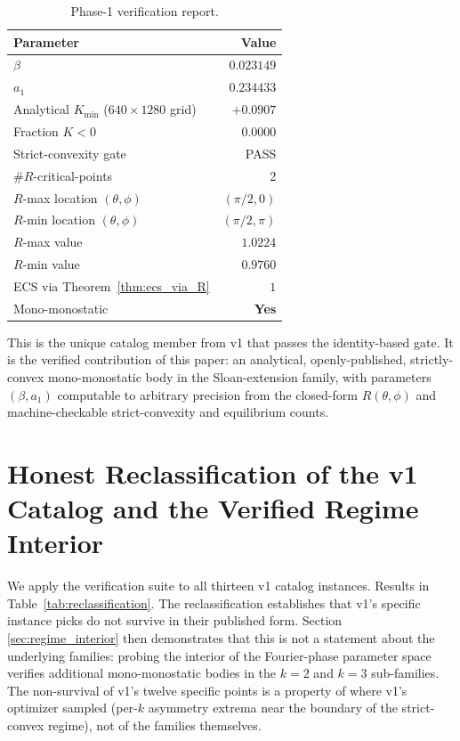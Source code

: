 \documentclass[11pt,a4paper]{article}
\begin{document}
\begin{table}[h]
\centering
\caption{Phase-1 verification report.}
\label{tab:phase1_report}
\begin{tabular}{lr}
\toprule
Parameter & Value \\
\midrule
$\beta$ & $0.023149$ \\
$a_1$ & $0.234433$ \\
\midrule
Analytical $K_{\min}$ ($640\times1280$ grid) & $+0.0907$ \\
Fraction $K < 0$ & $0.0000$ \\
Strict-convexity gate & PASS \\
\midrule
$\#R$-critical-points & 2 \\
$R$-max location $(\theta, \phi)$ & $(\pi/2, 0)$ \\
$R$-min location $(\theta, \phi)$ & $(\pi/2, \pi)$ \\
$R$-max value & $1.0224$ \\
$R$-min value & $0.9760$ \\
\midrule
ECS via Theorem~\ref{thm:ecs_via_R} & $1$ \\
Mono-monostatic & \textbf{Yes} \\
\bottomrule
\end{tabular}
\end{table}

This is the unique catalog member from v1 that passes the
identity-based gate. It is the verified contribution of this
paper: an analytical, openly-published, strictly-convex
mono-monostatic body in the Sloan-extension family, with
parameters $(\beta, a_1)$ computable to arbitrary precision from
the closed-form $R(\theta,\phi)$ and machine-checkable strict-convexity
and equilibrium counts.

\section{Honest Reclassification of the v1 Catalog and the
Verified Regime Interior}
\label{sec:v1_reclassification}

We apply the verification suite to all thirteen v1 catalog
instances. Results in Table~\ref{tab:reclassification}. The
reclassification establishes that v1's specific instance picks
do not survive in their published form. Section
\ref{sec:regime_interior} then demonstrates that this is not a
statement about the underlying families: probing the interior of
the Fourier-phase parameter space verifies additional
mono-monostatic bodies in the $k=2$ and $k=3$ sub-families. The
non-survival of v1's twelve specific points is a property of where
v1's optimizer sampled (per-$k$ asymmetry extrema near the
boundary of the strict-convex regime), not of the families
themselves.
\end{document}
